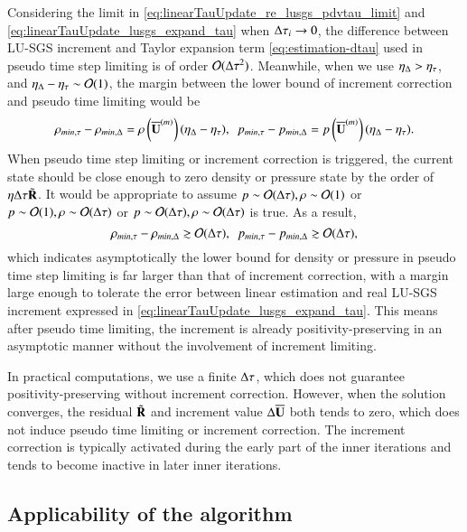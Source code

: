 Considering the limit in \eqref{eq:linearTauUpdate_re_lusgs_pdvtau_limit} 
and \eqref{eq:linearTauUpdate_lusgs_expand_tau}
when $\mathrm\Delta\tau_i\rightarrow 0$,
the difference between LU-SGS increment and 
Taylor expansion term \eqref{eq:estimation-dtau} used in pseudo time step limiting
is of order $\mathcal{O}(\mathrm\Delta\tau^2)$. 
Meanwhile, when we use $\eta_\mathrm\Delta > \eta_\tau$,
and $\eta_\mathrm\Delta - \eta_\tau \sim \mathcal{O}(1)$,
the margin between the 
lower bound of 
increment correction and pseudo time limiting
would be 
\begin{equation}
\rho_{min,\tau} - \rho_{min,\inc}= 
\rho\left(\uu^{(m)}\right) (\eta_\inc - \eta_\tau),\ \ 
p_{min,\tau} - p_{min,\inc}= 
p\left(\uu^{(m)}\right) (\eta_\inc - \eta_\tau).
\end{equation}
When pseudo time step limiting or increment correction is triggered,
the current state should be close enough to zero density or 
pressure state by the order of $\eta\mathrm\Delta\tau\tilde{\mathbf{R}}$.
It would be appropriate to assume 
$p\sim\mathcal{O}(\mathrm\Delta\tau), \rho\sim\mathcal{O}(1)$ 
or $p\sim\mathcal{O}(1), \rho\sim\mathcal{O}(\mathrm\Delta\tau)$
or $p\sim\mathcal{O}(\mathrm\Delta\tau), \rho\sim\mathcal{O}(\mathrm\Delta\tau)$
is true.
As a result,
\begin{equation}
\rho_{min,\tau} - \rho_{min,\inc} \gtrsim \ord (\inc \tau),\ \ 
p_{min,\tau} - p_{min,\inc} \gtrsim \ord (\inc \tau),
\end{equation}
which indicates asymptotically
the lower bound for density or pressure in pseudo time step limiting 
is far larger than that of increment correction, 
with a margin large enough to tolerate the error between 
linear estimation and real LU-SGS increment expressed in \eqref{eq:linearTauUpdate_lusgs_expand_tau}.
This means after pseudo time limiting, 
the increment is already positivity-preserving 
in an asymptotic manner without the involvement of 
increment limiting.

In practical computations, we use a finite $\mathrm\Delta \tau$, which 
does not guarantee positivity-preserving without increment correction.
However, when the solution converges, the 
residual $\tilde{\mathbf{R}}$ and increment value $\mathrm\Delta\overline{\mathbf{U}}$ both tends to zero,
which does not induce pseudo time limiting or increment correction.
The increment correction is typically activated during the early part of the inner iterations and tends to become inactive in later inner iterations. 


\subsection{Applicability of the algorithm}

